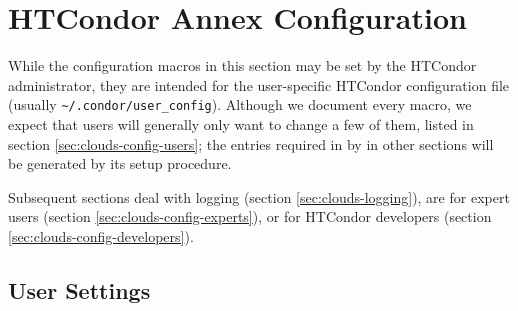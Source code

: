 \section{HTCondor Annex Configuration}\label{sec:clouds-config}

While the configuration macros in this section may be set by the HTCondor
administrator, they are intended for the user-specific HTCondor configuration
file (usually {\tt \textasciitilde/.condor/user\_config}).  Although we
document every macro, we expect that users will generally only want to
change a few of them, listed in section \ref{sec:clouds-config-users};
the entries required in by  in other sections will be
generated by its setup procedure.

Subsequent sections deal with logging
(section \ref{sec:clouds-logging}),
are for expert users
(section \ref{sec:clouds-config-experts}),
or for HTCondor developers
(section \ref{sec:clouds-config-developers}).

\subsection{\label{sec:clouds-config-users}User Settings}

